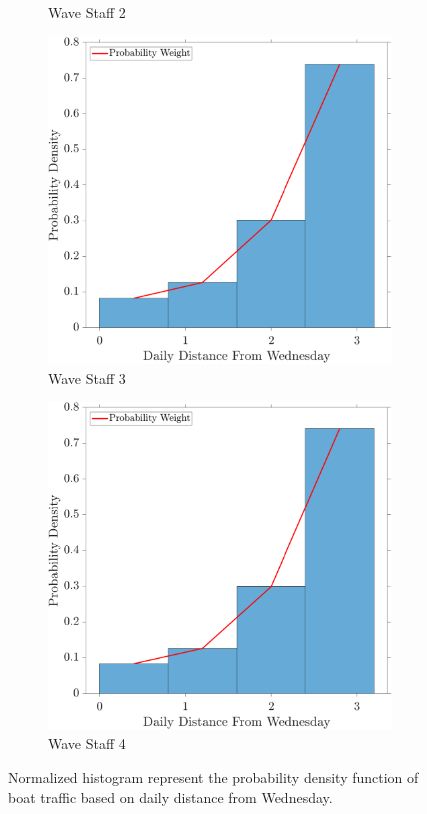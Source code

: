 \documentclass[
10pt, %
letterpaper, %
twoside, %
headinclude,footinclude, %
BCOR5mm, %
]{scrartcl}
\begin{document}
\begin{figure}[h!]
\begin{subfigure}[t]{0.49\linewidth}
		\caption{Wave Staff 2} 
		\label{fig:PDFL2}
	\end{subfigure}
	\begin{subfigure}[t]{0.49\linewidth}
		\centering
		\includegraphics[width=\linewidth]{figures/PDF_LOG3.pdf}
		\caption{Wave Staff 3} 
		\label{fig:PDFL3}
	\end{subfigure}
	\begin{subfigure}[t]{0.49\linewidth}
		\centering
		\includegraphics[width=\linewidth]{figures/PDF_LOG4.pdf}
		\caption{Wave Staff 4} 
		\label{fig:PDFL4}
	\end{subfigure}
	\caption{Normalized histogram represent the probability density function of boat traffic based on daily distance from Wednesday.}
	\label{fig:PDFs}
\end{figure}
\end{document}
